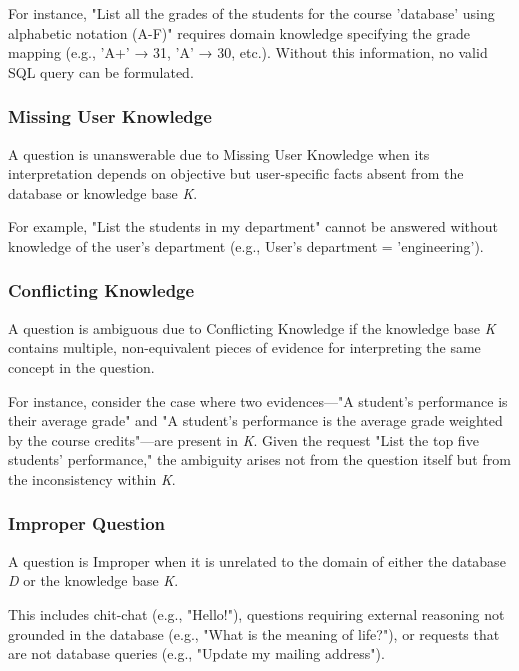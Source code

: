 For instance, "List all the grades of the students for the course 'database' using alphabetic notation (A-F)" requires domain knowledge specifying the grade mapping (e.g., 'A+' → 31, 'A' → 30, etc.). Without this information, no valid SQL query can be formulated.

\subsubsection{Missing User Knowledge}
A question is unanswerable due to Missing User Knowledge when its interpretation depends on objective but user-specific facts absent from the database or knowledge base \textit{K}.

For example, "List the students in my department" cannot be answered without knowledge of the user's department (e.g., User’s department = 'engineering').

\subsubsection{Conflicting Knowledge}
A question is ambiguous due to Conflicting Knowledge if the knowledge base \textit{K} contains multiple, non-equivalent pieces of evidence for interpreting the same concept in the question.

For instance, consider the case where two evidences—"A student's performance is their average grade" and "A student's performance is the average grade weighted by the course credits"—are present in \textit{K}. Given the request "List the top five students' performance," the ambiguity arises not from the question itself but from the inconsistency within \textit{K}.

\subsubsection{Improper Question}
A question is Improper when it is unrelated to the domain of either the database \textit{D} or the knowledge base \textit{K}.

This includes chit-chat (e.g., "Hello!"), questions requiring external reasoning not grounded in the database (e.g., "What is the meaning of life?"), or requests that are not database queries (e.g., "Update my mailing address").
